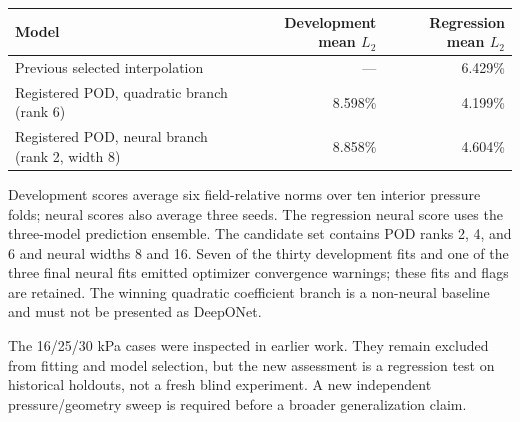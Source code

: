 \documentclass[11pt]{article}
\begin{document}
\begin{center}
\begin{tabular}{p{}rr}
\toprule
Model & Development mean $L_2$ & Regression mean $L_2$ \\
\midrule
Previous selected interpolation & --- & 6.429\% \\
Registered POD, quadratic branch (rank 6) & 8.598\% & 4.199\% \\
Registered POD, neural branch (rank 2, width 8) & 8.858\% & 4.604\% \\
\bottomrule
\end{tabular}
\end{center}
Development scores average six field-relative norms over ten interior
pressure folds; neural scores also average three seeds. The regression neural
score uses the three-model prediction ensemble. The candidate set contains
POD ranks 2, 4, and 6 and neural widths 8 and 16. Seven of the thirty
development fits and one of the three final neural fits emitted optimizer
convergence warnings; these fits and flags are retained. The winning quadratic coefficient branch
is a non-neural baseline and must not be presented as DeepONet.

\begin{warningbox}
The 16/25/30 kPa cases were inspected in earlier work. They remain excluded
from fitting and model selection, but the new assessment is a regression
test on historical holdouts, not a fresh blind experiment. A new independent
pressure/geometry sweep is required before a broader generalization claim.
\end{warningbox}

\clearpage
\end{document}
